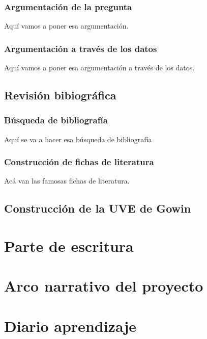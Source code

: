 \documentclass[
  10pt,
  letterpaper,
  12pt,
  oneside]{book}
\begin{document}
\subsection{Argumentación de la pregunta}

Aquí vamos a poner esa argumentación.

\subsection{Argumentación a través de los datos}

Aquí vamos a poner esa argumentación a través de los datos.

\section{Revisión bibiográfica}
\subsection{Búsqueda de bibliografía}

Aquí se va a hacer esa búsqueda de bibliografía

\subsection{Construcción de fichas de literatura}

Acá van las famosas fichas de literatura.

\section{Construcción de la UVE de Gowin}

\chapter*{Parte de escritura}

\chapter*{Arco narrativo del proyecto}

\chapter*{Diario aprendizaje}


\backmatter
\printbibliography
\end{document}
